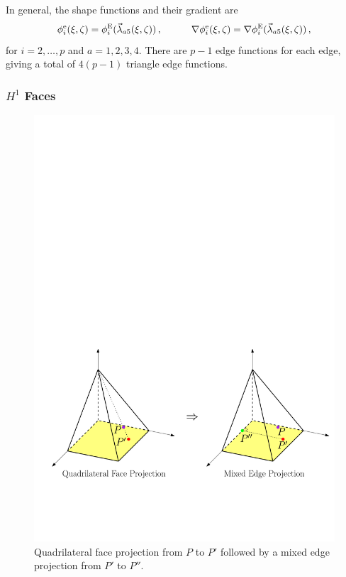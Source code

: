 In general, the shape functions and their gradient are
\begin{equation}
	\phi_i^\mathrm{e}(\xi,\zeta)=\phi_i^{\mathrm{E}}(\vec{\lambda}_{a5}(\xi,\zeta))\,,\qquad\quad
	\nabla\phi_i^\mathrm{e}(\xi,\zeta)=\nabla\phi_i^{\mathrm{E}}(\vec{\lambda}_{a5}(\xi,\zeta))\,,
	\label{eq:PyrH1TriaEdge}
\end{equation}
for $i=2,\ldots,p$ and $a=1,2,3,4$.
There are $p-1$ edge functions for each edge, giving a total of $4(p-1)$ triangle edge functions.


\subsubsection{\texorpdfstring{$H^1$}{H1} Faces}

\begin{figure}[!ht]
\begin{center}
\includegraphics[scale=0.6]{./figures/PyramidProjectionQuad.pdf}
\caption{Quadrilateral face projection from $P$ to $P'$ followed by a mixed edge projection from $P'$ to $P''$.}
\label{fig:PyramidProjectionQuad}
\end{center}
\end{figure}

